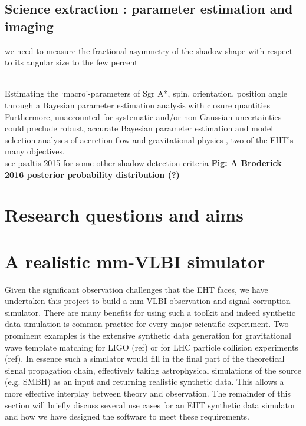 \subsection{Science extraction : parameter estimation and imaging}

we need to measure the fractional
asymmetry of the shadow shape with respect to its angular size to the few percent


~\\
Estimating the `macro'-parameters of Sgr A*, spin, orientation, position angle through a Bayesian parameter estimation analysis with closure quantities\\
Furthermore, unaccounted for systematic and/or non-Gaussian uncertainties could preclude robust, accurate Bayesian parameter estimation and model selection analyses of accretion flow \citep[e.g.][]{Broderick_2016} and gravitational physics \citep[e.g.][]{Broderick_2014, Psaltis_2016}, two of the EHT's many objectives.
~\\
see psaltis 2015 for  some other shadow detection criteria
\textbf{Fig: A Broderick 2016 posterior probability distribution (?)}

\section{Research questions and aims}



\section{A realistic mm-VLBI simulator}

Given the significant observation challenges that the EHT faces, we have undertaken this project to build a mm-VLBI observation and signal corruption simulator.  There are many benefits for using such a toolkit and indeed synthetic data simulation is common practice for every major scientific experiment. Two prominent examples is the  extensive synthetic data generation for gravitational wave template matching for LIGO (ref) or for LHC particle collision experiments (ref). In essence such a simulator would fill in the final part of the theoretical signal propagation chain, effectively taking  astrophysical simulations of the source (e.g. SMBH) as an input and returning realistic synthetic data. This allows a more effective interplay between theory and observation. The remainder of this section will briefly discuss several use cases for an EHT synthetic data simulator and how we have designed the software to meet these requirements. 

